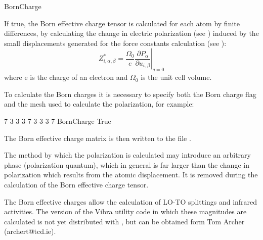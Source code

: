   \begin{fdflogicalF}{BornCharge}

    If true, the Born effective charge tensor is calculated for each
    atom by finite differences, by calculating the change in electric
    polarization (see ) induced by the small
    displacements generated for the force constants calculation (see
    ):
    \begin{equation}
      \label{eq:effective_charge}
      Z^*_{i,\alpha,\beta}=\frac{\Omega_0}{e} \left. {\frac{\partial{P_\alpha}}
            {\partial{u_{i,\beta}}}}\right|_{q=0}
    \end{equation}
    where e is the charge of an electron and $\Omega_0$ is the unit cell
    volume.

    To calculate the Born charges it is necessary to specify both the
    Born charge flag and the mesh used to calculate the polarization,
    for example:
    \begin{fdfexample}
        7  3  3
        3  7  3
        3  3  7
      BornCharge True
    \end{fdfexample}

    The Born effective charge matrix is then written to the file
    .

    The method by which the polarization is calculated may introduce an
    arbitrary phase (polarization quantum), which in general is far
    larger than the change in polarization which results from the atomic
    displacement. It is removed during the calculation of the Born
    effective charge tensor.

    The Born effective charges allow the calculation of LO-TO splittings
    and infrared activities. The version of the Vibra utility code in
    which these magnitudes are calculated is not yet distributed with
    \siesta, but can be obtained form Tom Archer (archert@tcd.ie).

  \end{fdflogicalF}



